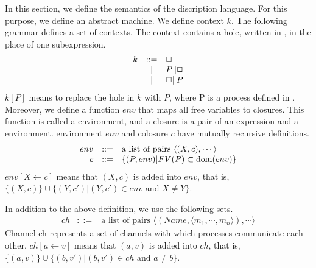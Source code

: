 In this section, we define the semantics of the discription language.
For this purpose, we define an abstract machine.
We define context \(k\).
The following grammar defines a set of contexts.
The context contains a hole, written in \hole, in the place of one subexpression.
  \begin{displaymath}
    \begin{array}{lcl}
k     &::=& \mbox{$\Box$} \\
      & | & P\|\mbox{$\Box$}\\
      & | & \mbox{$\Box$}\|P
    \end{array}
  \end{displaymath}
$k[P]$ means to replace the hole in $k$ with $P$, where P is a process defined in .
Moreover, we define a function $env$ that maps all free variables to closures.
This function is called a environment, and a closure is a pair of an expression and a environment.
environment \(env\) and colosure \(c\) have mutually recursive definitions.
  \begin{displaymath}
    \begin{array}{rcl}
env &::=& \mbox{a list of pairs }\langle(X,c),\cdots\rangle\\
c &::=& \{(P,env)|FV(P)\subset \mathop{\mathrm{dom}}\nolimits(env)\}\\
    \end{array}
  \end{displaymath}
\(env[X\leftarrow c]\) means that \((X,c)\) is added into \(env\), that is, 
\(\{(X,c)\}\cup\{(Y,c')|(Y,c')\in env \mbox{ and } X\neq Y\}\).

In addition to the above definition, we use the following sets.
  \begin{displaymath}
    \begin{array}{rcl}
ch &::=&\mbox{a list of pairs }\langle(Name,\langle m_1,\cdots,m_n\rangle),\cdots\rangle
    \end{array}
  \end{displaymath}
Channel ch represents a set of channels with which processes communicate each other.
\(ch[a\leftarrow v]\) means that \((a,v)\) is added into \(ch\), that is, 
\(\{(a,v)\}\cup\{(b,v')|(b,v')\in ch \mbox{ and } a\neq b\}\).

